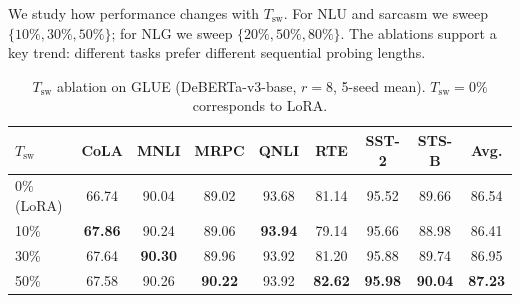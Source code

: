 \documentclass{article}
\newcommand{\Tswitch}{T_{\mathrm{sw}}}
\begin{document}
We study how performance changes with $\Tswitch$.
For NLU and sarcasm we sweep $\{10\%, 30\%, 50\%\}$; for NLG we sweep $\{20\%, 50\%, 80\%\}$.
The ablations support a key trend: different tasks prefer different sequential probing lengths.

\begin{table}[!ht]
\caption{$\Tswitch$ ablation on GLUE (DeBERTa-v3-base, $r=8$, 5-seed mean). $\Tswitch=0\%$ corresponds to LoRA.}
\label{tab:nlu_ablation}
\centering
\footnotesize
\setlength{\tabcolsep}{4pt}
\begin{tabular}{l | ccccccc | c}
\toprule
$\Tswitch$ & \textbf{CoLA} & \textbf{MNLI} & \textbf{MRPC} & \textbf{QNLI} & \textbf{RTE} & \textbf{SST-2} & \textbf{STS-B} & \textbf{Avg.} \\
\midrule
0\% (LoRA) & 66.74 & 90.04 & 89.02 & 93.68 & 81.14 & 95.52 & 89.66 & 86.54 \\
10\%       & \textbf{67.86} & 90.24 & 89.06 & \textbf{93.94} & 79.14 & 95.66 & 88.98 & 86.41 \\
30\%       & 67.64 & \textbf{90.30} & 89.96 & 93.92 & 81.20 & 95.88 & 89.74 & 86.95 \\
50\%       & 67.58 & 90.26 & \textbf{90.22} & 93.92 & \textbf{82.62} & \textbf{95.98} & \textbf{90.04} & \textbf{87.23} \\
\bottomrule
\end{tabular}
\end{table}
\end{document}
